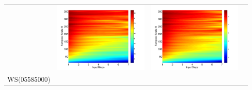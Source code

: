 \documentclass[draft,wrr]{AGUTeX}
\begin{document}
\begin{article}
\begin{table}[H]
\begin{tabular}{cccc}
&\begin{minipage}{.3\textwidth}\includegraphics[width=\linewidth]{resultgraph/02143000pep_abs.png}\end{minipage}
&\begin{minipage}{.3\textwidth}\includegraphics[width=\linewidth]{resultgraph/02143000pepq_abs.png}\end{minipage}
\\
WS(05585000)

\end{tabular}
\end{table}
\end{article}
\end{document}
